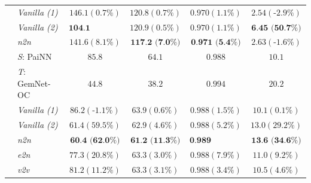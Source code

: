 \begin{table}[h]
\begin{tabular}{llcccc}
& \emph{Vanilla (1)}                  &            $146.1 (0.7\%)$          &         $120.8 (0.7\%)$     &     $0.970 (1.1\%)$        &  $2.54 (\text{-}2.9\%)$    \\
& \emph{Vanilla (2)}                  &            $\textbf{104.1 (69.9\%)}$          &          $120.9 (0.5\%)$     &     $0.970 (1.1\%)$        &  $\textbf{6.45 (50.7\%)}$    \\
& \emph{n2n}                          &            $141.6 (8.1\%)$          &          $\textbf{117.2 (7.0\%)}$     &     $\textbf{0.971 (5.4\%)}$        &  $2.63 (\text{-}1.6\%)$    \\
\cmidrule(r){1-6}
\parbox[t]{2mm}{} 
& \emph{S}: PaiNN           &  $85.8$                   & $64.1$                   & $0.988$                   &   $10.1$    \\
& \emph{T}: GemNet-OC       &  $44.8$                   & $38.2$                   & $0.994$                   &   $20.2$    \\
& \emph{Vanilla (1)}        &  $86.2 (\text{-}1.1\%)$   & $63.9 (0.6\%)$           & $0.988 (1.5\%)$           &  $10.1 (0.1\%)$    \\
& \emph{Vanilla (2)}        &  $61.4 (59.5\%)$          & $62.9 (4.6\%)$           & $0.988 (5.2\%)$           &  $13.0 (29.2\%)$    \\
& \emph{n2n}                &  $\textbf{60.4 (62.0\%)}$ & $\textbf{61.2 (11.3\%)}$ & $\textbf{0.989 (14.9\%)}$ &  $\textbf{13.6 (34.6\%)}$\\
& \emph{e2n}                &  $77.3 (20.8\%)$          & $63.3 (3.0\%)$           & $0.988 (7.9\%)$           &  $11.0 (9.2\%)$    \\
& \emph{v2v}                &  $81.2 (11.2\%)$          & $63.3 (3.1\%)$           & $0.988 (3.4\%)$           &  $10.5 (4.6\%)$    \\   
\cmidrule(r){1-6}
\end{tabular}
\label{tab:coll_results}
\end{table}

\raggedbottom